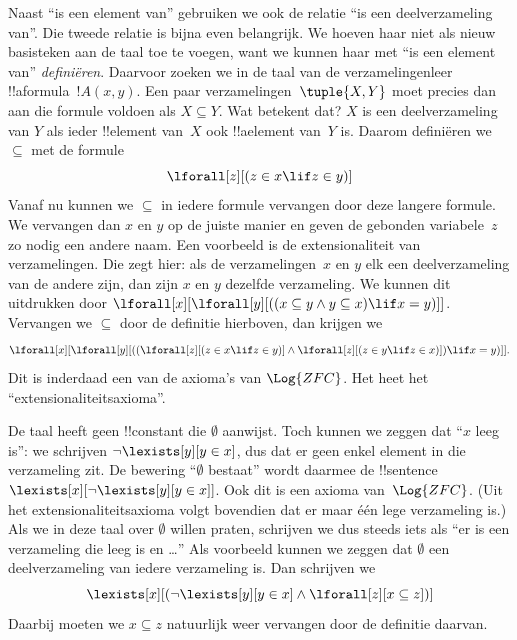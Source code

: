 \documentclass[openany]{memoir}
\begin{document}
Naast ``is een element van'' gebruiken we ook de relatie ``is een
deelverzameling van''. Die tweede relatie is bijna even belangrijk. We
hoeven haar niet als nieuw basisteken aan de taal toe te voegen, want
we kunnen haar met ``is een element van'' \emph{definiëren}. Daarvoor
zoeken we in de taal van de verzamelingenleer !!a{formula}~$!A(x, y)$.
Een paar verzamelingen~$\tuple{X, Y}$ moet precies dan aan die formule
voldoen als $X \subseteq Y$. Wat betekent dat? $X$ is een
deelverzameling van $Y$ als ieder !!{element} van~$X$ ook
!!a{element} van~$Y$ is. Daarom definiëren we $\subseteq$ met de
formule
\[
\lforall[z][(z \in x \lif z \in y)]
\]
Vanaf nu kunnen we $\subseteq$ in iedere formule vervangen door deze
langere formule. We vervangen dan $x$ en $y$ op de juiste manier en
geven de gebonden variabele~$z$ zo nodig een andere naam. Een voorbeeld
is de extensionaliteit van verzamelingen. Die zegt hier: als de
verzamelingen~$x$ en $y$ elk een deelverzameling van de andere zijn,
dan zijn $x$ en $y$ dezelfde verzameling. We kunnen dit uitdrukken door
$\lforall[x][\lforall[y][((x \subseteq y \land y
    \subseteq x) \lif x = y)]]$. Vervangen we $\subseteq$ door de
definitie hierboven, dan krijgen we
\[
\lforall[x][\lforall[y][((\lforall[z][(z \in x \lif z \in y)] \land
    \lforall[z][(z \in y \lif z \in x)]) \lif x = y)]].
\]
Dit is inderdaad een van de axioma's van $\Log{ZFC}$. Het heet het
``extensionaliteitsaxioma''.

De taal heeft geen !!{constant} die $\emptyset$ aanwijst. Toch kunnen
we zeggen dat ``$x$ leeg is'': we schrijven $\lnot \lexists[y][y \in
x]$, dus dat er geen enkel element in die verzameling zit. De bewering ``$\emptyset$
bestaat'' wordt daarmee de !!{sentence}~$\lexists[x][\lnot
\lexists[y][y \in x]]$. Ook dit is een axioma van~$\Log{ZFC}$.
(Uit het extensionaliteitsaxioma volgt bovendien dat er maar één lege
verzameling is.) Als we in deze taal over $\emptyset$ willen praten,
schrijven we dus steeds iets als ``er is een verzameling die leeg is en
\dots'' Als voorbeeld kunnen we zeggen dat $\emptyset$ een
deelverzameling van iedere verzameling is. Dan schrijven we
\[
\lexists[x][(\lnot\lexists[y][y \in x] \land \lforall[z][x \subseteq
    z])]
\]
Daarbij moeten we $x \subseteq z$ natuurlijk weer vervangen door de
definitie daarvan.
\end{document}
